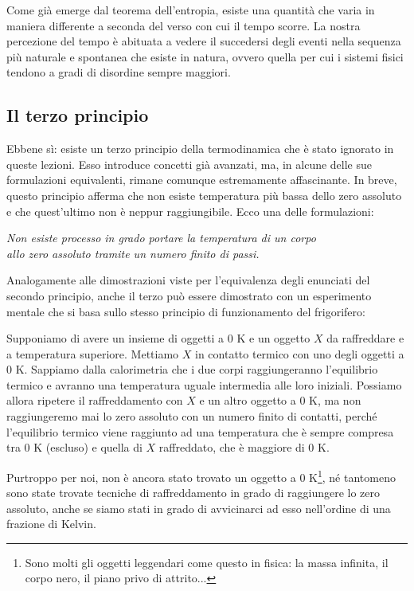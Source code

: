 Come già emerge dal teorema dell'entropia, esiste una quantità
che varia in maniera differente a seconda del verso con cui il
tempo scorre. La nostra percezione del tempo è abituata a vedere
il succedersi degli eventi nella sequenza più naturale e spontanea
che esiste in natura, ovvero quella per cui i sistemi fisici tendono
a gradi di disordine sempre maggiori.

\subsection{Il terzo principio}
Ebbene sì: esiste un terzo principio della termodinamica che è stato
ignorato in queste lezioni. Esso introduce concetti già avanzati, ma,
in alcune delle sue formulazioni equivalenti, rimane comunque estremamente
affascinante. In breve, questo principio afferma che non esiste
temperatura più bassa dello zero assoluto e che quest'ultimo non è
neppur raggiungibile. Ecco una delle formulazioni:

\begin{center}
    \textit{Non esiste processo in grado portare la temperatura di un corpo\\allo
    zero assoluto tramite un numero finito di passi.}
\end{center}

\noindent Analogamente alle dimostrazioni viste per l'equivalenza
degli enunciati del secondo principio, anche il terzo può essere
dimostrato con un esperimento mentale che si basa sullo stesso principio
di funzionamento del frigorifero:

Supponiamo di avere un insieme di oggetti a 0 K e un oggetto $X$ da
raffreddare e a temperatura superiore. Mettiamo $X$ in
contatto termico con uno degli oggetti a 0 K. Sappiamo dalla calorimetria
che i due corpi raggiungeranno l'equilibrio termico e avranno una
temperatura uguale intermedia alle loro iniziali. Possiamo allora
ripetere il raffreddamento con $X$ e un altro oggetto a 0 K, ma
non raggiungeremo mai lo zero assoluto con un numero finito di
contatti, perché l'equilibrio termico viene raggiunto ad una temperatura
che è sempre compresa tra 0 K (escluso) e quella di $X$ raffreddato, che
è maggiore di 0 K.

Purtroppo per noi, non è ancora stato trovato un oggetto a 0 K\footnote{Sono
molti gli oggetti leggendari come questo in fisica: la massa infinita, il
corpo nero, il piano privo di attrito...}, né tantomeno sono state
trovate tecniche di raffreddamento in grado di raggiungere lo zero
assoluto, anche se siamo stati in grado di avvicinarci ad esso
nell'ordine di una frazione di Kelvin.


